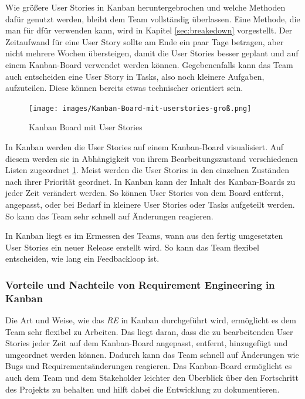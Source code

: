 \documentclass[acmtog]{acmart}
\begin{document}
Wie größere User Stories in Kanban heruntergebrochen und welche Methoden dafür genutzt werden, bleibt
dem Team vollständig überlassen. Eine Methode, die man für dfür verwenden kann, wird in Kapitel \ref{sec:breakedown} vorgestellt.
Der Zeitaufwand für eine User Story sollte am Ende ein paar Tage betragen, aber nicht mehrere Wochen übersteigen, damit die User Stories besser
geplant und auf einem Kanban-Board verwendet werden können. Gegebenenfalls kann das Team auch entscheiden eine User Story in Tasks, also noch
kleinere Aufgaben, aufzuteilen. Diese können bereits etwas technischer orientiert sein. \cite{agileprocesses}

\begin{figure}[t]
	\centering
	\texttt{[image: images/Kanban-Board-mit-userstories-groß.png]}
	\caption{Kanban Board mit User Stories}
	\label{fig:kanban-board}
	\Description{}
\end{figure}

In Kanban werden die User Stories auf einem Kanban-Board visualisiert. Auf diesem werden sie in Abhängigkeit von
ihrem Bearbeitungszustand verschiedenen Listen zugeordnet \ref{fig:kanban-board}. Meist werden die User Stories in den einzelnen
Zuständen nach ihrer Priorität geordnet. In Kanban kann der Inhalt des Kanban-Boards zu jeder Zeit verändert werden.
So können User Stories von dem Board entfernt, angepasst, oder bei Bedarf in kleinere User Stories oder Tasks aufgeteilt werden. So kann das Team sehr schnell
auf Änderungen reagieren. \cite{agileprocesses}

In Kanban liegt es im Ermessen des Teams, wann aus den fertig umgesetzten User Stories ein neuer Release
erstellt wird. So kann das Team flexibel entscheiden, wie lang ein Feedbackloop ist. \cite{agileprocesses}

\subsubsection{Vorteile und Nachteile von Requirement Engineering in Kanban}

Die Art und Weise, wie das \emph{RE} in Kanban durchgeführt wird, ermöglicht es dem Team sehr flexibel zu Arbeiten.
Das liegt daran, dass die zu bearbeitenden User Stories jeder Zeit auf dem Kanban-Board angepasst, entfernt,
hinzugefügt und umgeordnet werden können. Dadurch kann das Team schnell auf Änderungen wie Bugs und Requirementsänderungen
reagieren. Das Kanban-Board ermöglicht es auch dem Team und dem Stakeholder leichter den Überblick über den
Fortschritt des Projekts zu behalten und hilft dabei die Entwicklung zu dokumentieren.
\end{document}
